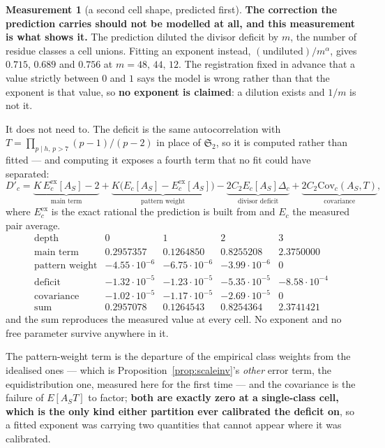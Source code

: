 \documentclass[11pt,a4paper]{article}
\theoremstyle{plain}
\theoremstyle{definition}
\newtheorem{measurement}[theorem]{Measurement}
\theoremstyle{remark}
\renewcommand{\SS}{\mathfrak{S}}
\begin{document}
\begin{measurement}[a second cell shape, predicted first]
\textbf{The correction the prediction carries should not be modelled at
all, and this measurement is what shows it.} The prediction diluted the
divisor deficit by $m$, the number of residue classes a cell unions.
Fitting an exponent instead, $(\text{undiluted})/m^{\alpha}$, gives
$0.715$, $0.689$ and $0.756$ at $m=48,\,44,\,12$. The registration
fixed in advance that a value strictly between $0$ and $1$ says the
model is wrong rather than that the exponent is that value, so
\textbf{no exponent is claimed}: a dilution exists and $1/m$ is not
it.

It does not need to. The deficit is the same autocorrelation with
$T=\prod_{p\mid h,\,p>7}(p-1)/(p-2)$ in place of $\SS_2$, so it is
computed rather than fitted --- and computing it exposes a fourth term
that no fit could have separated:
\[
  D'_c=\underbrace{K\,E^{\mathrm{ex}}_{c}[A_S]-2}_{\text{main term}}
        +\underbrace{K\bigl(E_c[A_S]-E^{\mathrm{ex}}_{c}[A_S]\bigr)}
          _{\text{pattern weight}}
        -\underbrace{2C_2E_c[A_S]\Delta_c}_{\text{divisor deficit}}
        +\underbrace{2C_2\mathrm{Cov}_c(A_S,T)}_{\text{covariance}},
\]
where $E^{\mathrm{ex}}_c$ is the exact rational the prediction is built
from and $E_c$ the measured pair average.
\[
\begin{array}{r|cccc}
 \text{depth} & 0 & 1 & 2 & 3\\\hline
 \text{main term} & 0.2957357 & 0.1264850 & 0.8255208 & 2.3750000\\
 \text{pattern weight} & -4.55\cdot10^{-6} & -6.75\cdot10^{-6}
   & -3.99\cdot10^{-6} & 0\\
 \text{deficit} & -1.32\cdot10^{-5} & -1.23\cdot10^{-5}
   & -5.35\cdot10^{-5} & -8.58\cdot10^{-4}\\
 \text{covariance} & -1.02\cdot10^{-5} & -1.17\cdot10^{-5}
   & -2.69\cdot10^{-5} & 0\\
 \text{sum} & 0.2957078 & 0.1264543 & 0.8254364 & 2.3741421
\end{array}
\]
and the sum reproduces the measured value at every cell. No exponent
and no free parameter survive anywhere in it.

The pattern-weight term is the departure of the empirical class weights
from the idealised ones --- which is
Proposition~\ref{prop:scaleinv}'s \emph{other} error term, the
equidistribution one, measured here for the first time --- and the
covariance is the failure of $E[A_ST]$ to factor; \textbf{both are
exactly zero at a single-class cell, which is the only kind either
partition ever calibrated the deficit on}, so a fitted exponent was
carrying two quantities that cannot appear where it was calibrated.


\end{measurement}
\end{document}
